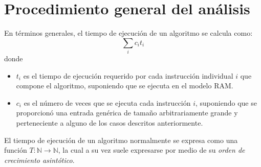 \section{Procedimiento general del análisis}

En términos generales, el tiempo de ejecución de un algoritmo se calcula como:
\[
  \sum_ic_it_i
\]
donde
\begin{itemize}
  \item \(t_i\) es el tiempo de ejecución requerido por cada instrucción individual \(i\) que compone el algoritmo, suponiendo que se ejecuta en el modelo RAM.
  \item \(c_i\) es el número de veces que se ejecuta cada instrucción \(i\), suponiendo que se proporcionó una entrada genérica de tamaño arbitrariamente grande y perteneciente a alguno de los casos descritos anteriormente.
\end{itemize}

El tiempo de ejecución de un algoritmo normalmente se expresa como una función \(T:\mathbb{N}\to\mathbb{N}\), la cual a su vez suele expresarse por medio de su \emph{orden de crecimiento asintótico}.

